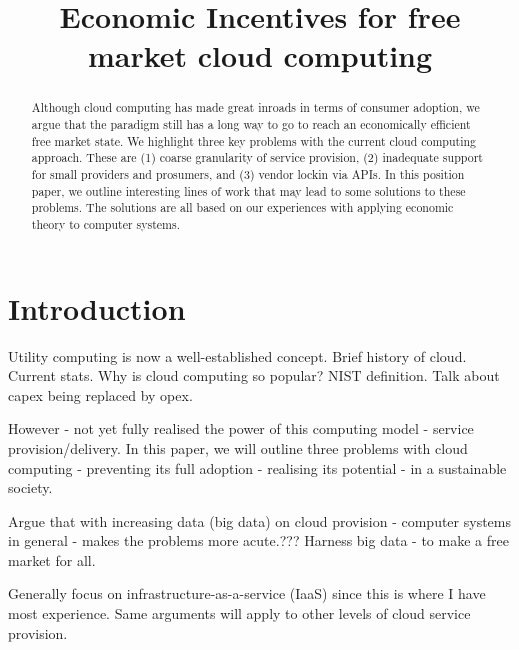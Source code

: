 \documentclass[conference,10pt]{IEEEtran}
\begin{document}
\title{Economic Incentives for free market cloud computing}


\author{
}

\maketitle


\begin{abstract}
Although cloud computing has made great inroads in terms of consumer adoption, we argue that the paradigm still has a long way to go to reach an economically efficient free market state.
We highlight three key problems with the current cloud computing approach. These are (1) coarse granularity of service provision, (2) inadequate support for small providers and prosumers, and (3) vendor lockin via APIs.
In this position paper, we outline interesting lines of work that may lead to some solutions to these problems. The solutions are all based on our experiences with applying economic theory to computer systems.
\end{abstract}


\section{Introduction}

Utility computing is now a well-established concept. Brief history of cloud.
Current stats. Why is cloud computing so popular? NIST definition. Talk about capex being replaced by opex.

However - not yet fully realised the power of this computing model - service provision/delivery. In this paper, we will outline three problems with cloud computing - preventing its full adoption - realising its potential - in a sustainable society.

Argue that with increasing data (big data) on cloud provision - computer systems in general - makes the problems more acute.??? Harness big data - to make a free market for all. 

Generally focus on infrastructure-as-a-service (IaaS) since this is where I have most experience. Same arguments will apply to other levels of cloud service provision.
\end{document}
